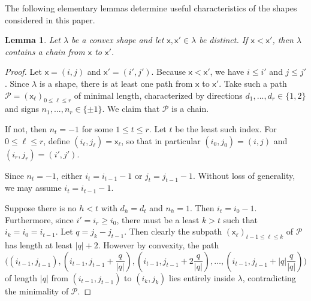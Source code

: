 \documentclass[12pt]{amsart}
\newcommand{\x}{\ensuremath{\mathsf{x}}}
\newtheorem{lemma}[theorem]{Lemma}
\theoremstyle{definition}
\theoremstyle{remark}
\numberwithin{equation}{section}
\begin{document}
The following elementary lemmas determine useful characteristics of the shapes considered in this paper. 

\begin{lemma} \label{lem:convex_chain}
Let $\lambda$ be a convex shape and let $\x,\x' \in \lambda$ be distinct. If $\x < \x'$, then $\lambda$ contains a chain from $\x$ to $\x'$. 
\end{lemma}

\begin{proof} 
Let $\x = (i,j)$ and $\x' = (i',j')$. Because $\x < \x'$, we have $i \leq i'$ and $j \leq j'$. Since $\lambda$ is a shape, there is at least one path from $\x$ to $\x'$. Take such a path $\mathscr{P} = (\x_{\ell})_{0\leq \ell \leq r}$ of minimal length, characterized by directions $d_1,...,d_r \in \{ 1,2 \}$ and signs $n_1,...,n_r \in \{ \pm 1\}$.  We claim that $\mathscr{P}$ is a chain. 

If not, then $n_t  = -1$ for some $1 \leq t \leq r$. Let $t$ be the least such index. For  $0 \leq \ell \leq r$, define $(i_\ell, j_\ell) = \x_\ell$, so that in particular $(i_0, j_0) = (i,j)$ and $(i_r, j_r) = (i',j')$.


Since $n_t = -1$, either $i_t = i_{t-1} -1$ or $j_t = j_{t-1} -1$.  Without loss of generality, we may assume $i_t = i_{t-1} -1$. 

Suppose there is no $h < t$ with $d_h = d_t$ and $n_h = 1$. Then $i_t = i_0 - 1$. Furthermore, since $i' = i_r \geq i_0$, there must be a least $k > t$ such that $i_k = i_0 = i_{t-1}$. Let $q = j_k - j_{t-1} $. Then clearly the subpath $(\x_{\ell})_{t-1\leq \ell \leq k}$ of $\mathscr{P}$ has length at least $|q| + 2$.
However by convexity, the path 
\[
\bigg( (i_{t-1}, j_{t-1}),   (i_{t-1}, j_{t-1} + \frac{q}{|q|}), (i_{t-1}, j_{t-1} + 2\frac{q}{|q|}), \dots , (i_{t-1}, j_{t-1} + |q|\frac{q}{|q|}) \bigg)
\]
of length $|q|$ from $(i_{t-1}, j_{t-1})$ to $(i_k, j_k)$ lies entirely inside $\lambda$, contradicting the minimality of $\mathscr{P}$.


\end{proof}
\end{document}
